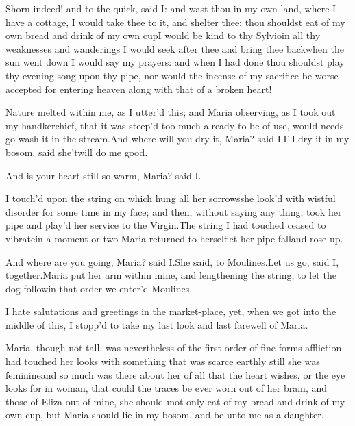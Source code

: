 \documentclass[twoside]{article}
\begin{document}
Shorn indeed! and to the quick, said I:
and wast thou in my own land, where I have
a cottage, I would take thee to it, and
shelter thee: thou shouldst eat of my own
bread and drink of my own cup\tskk I
would be kind to thy Sylvio\tskk in all
thy weaknesses and wanderings I would seek
after thee and bring thee back\tskk when
the sun went down I would say my prayers:
and when I had done thou shouldst play thy
evening song upon thy pipe, nor would the
incense of my sacrifice be worse accepted
for entering heaven along with that of a
broken heart!

Nature melted within me, as I utter’d
this; and Maria observing, as I took out
my handkerchief, that it was steep’d too
much already to be of use, would needs go
wash it in the stream.\tskk And where will
you dry it, Maria? said I.\tskk I’ll dry
it in my bosom, said she\tskk ’twill do
me good.

And is your heart still so warm, Maria?
said I.

I touch’d upon the string on which hung
all her sorrows\tskk she look’d with
wistful disorder for some time in my face;
and then, without saying any thing, took
her pipe and play’d her service to the
Virgin.\tskk The string I had touched
ceased to vibrate\tskk in a moment or two
Maria returned to herself\tskk let her
pipe fall\tskk and rose up.

And where are you going, Maria? said
I.\tskk She said, to Moulines.\tskk Let us
go, said I, together.\tskk Maria put her
arm within mine, and lengthening the
string, to let the dog follow\tskk in
that order we enter’d Moulines.





\vskip 6pt


 I hate salutations and
greetings in the market-place, yet, when
we got into the middle of this, I stopp’d
to take my last look and last farewell of
Maria.

Maria, though not tall, was nevertheless
of the first order of fine forms\tskk
affliction had touched her looks with
something that was scarce earthly\tskk
still she was feminine\tskk and so much
was there about her of all that the heart
wishes, or the eye looks for in woman,
that could the traces be ever worn out of
her brain, and those of Eliza out of mine,
she should \i{not only eat of my bread and
drink of my own cup}, but Maria should lie
in my bosom, and be unto me as a daughter.
\end{document}
